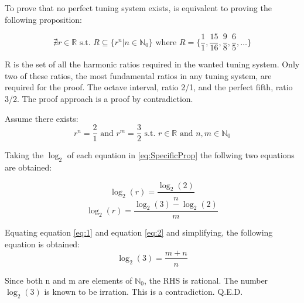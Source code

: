 
To prove that no perfect tuning system exists, is equivalent to proving the
following proposition:

\begin{equation}\label{eq:GeneralProp}
	\nexists r \in \mathbb{R} \text{ s.t. }
	R \subseteq \{ r^n | n \in \mathbb{N}_0 \}
	\text{ where } R = \{ \frac{1}{1}, \frac{15}{16}, \frac{9}{8}, \frac{6}{5}, \dots \}
\end{equation}

R is the set of all the harmonic ratios required in the wanted tuning system. Only
two of these ratios, the most fundamental ratios in any tuning system, are
required for the proof. The octave interval, ratio 2/1, and the perfect fifth, ratio
3/2. The proof approach is a proof by contradiction.

Assume there exists:
\begin{equation}\label{eq:SpecificProp}
	r^n = \frac{2}{1} \text{ and } r^m = \frac{3}{2}
	\text{ s.t. }
	r \in \mathbb{R} \text{ and } n,m \in \mathbb{N}_0
\end{equation}

Taking the $\log_{2}$ of each equation in \ref{eq:SpecificProp} the follwing two
equations are obtained:

\begin{equation}\label{eq:1}
	\log_{2}(r) = \frac{\log_{2}(2)}{n}
\end{equation}
\begin{equation}\label{eq:2}
	\log_{2}(r) = \frac{\log_{2}(3) - \log_{2}(2)}{m}
\end{equation}

Equating equation \ref{eq:1} and equation \ref{eq:2} and simplifying, the following
equation is obtained:
\begin{equation}\label{eq:2}
	\log_{2}(3) = \frac{m+n}{n}
\end{equation}

Since both n and m are elements of $\mathbb{N}_0$, the RHS is rational.
The number $\log_{2}(3)$ is known to be irration. This is a contradiction. Q.E.D.
